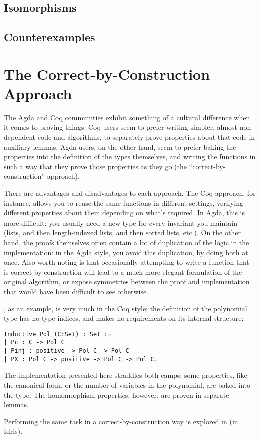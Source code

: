 \documentclass[draft, twocolumn]{article}
\theoremstyle{definition}
\begin{document}
\subsection{Isomorphisms}
\subsection{Counterexamples}
\section{The Correct-by-Construction Approach}
The Agda and Coq communities exhibit something of a cultural difference when it
comes to proving things. Coq users seem to prefer writing simpler, almost
non-dependent code and algorithms, to separately prove properties about that
code in auxiliary lemmas. Agda users, on the other hand, seem to prefer baking
the properties into the definition of the types themselves, and writing the
functions in such a way that they prove those properties as they go (the
``correct-by-construction'' approach).

There are advantages and disadvantages to each approach. The Coq approach, for
instance, allows you to reuse the same functions in different settings,
verifying different properties about them depending on what's required. In Agda,
this is more difficult: you usually need a new type for every invariant you
maintain (lists, and then length-indexed lists, and then sorted lists, etc.). On
the other hand, the proofs themselves often contain a lot of duplication of the
logic in the implementation: in the Agda style, you avoid this duplication, by
doing both at once. Also worth noting is that occasionally attempting to write a
function that is correct by construction will lead to a much more elegant
formulation of the original algorithm, or expose symmetries between the proof
and implementation that would have been difficult to see otherwise.

\cite{hutchison_proving_2005}, as an example, is very much in the Coq style: the
definition of the polynomial type has no type indices, and makes no requirements
on its internal structure:
\begin{verbatim}
Inductive Pol (C:Set) : Set :=
| Pc : C -> Pol C
| Pinj : positive -> Pol C -> Pol C
| PX : Pol C -> positive -> Pol C -> Pol C.
\end{verbatim}

The implementation presented here straddles both camps: some properties, like
the canonical form, or the number of variables in the polynomial, are baked into
the type. The homomorphism properties, however, are proven in separate lemmas.

Performing the same task in a correct-by-construction way is explored
in\cite{geuvers_automatically_2017} (in Idris\cite{brady_idris_2013}).



\end{document}
